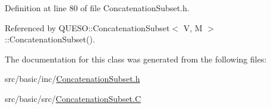 Definition at line 80 of file Concatenation\-Subset.\-h.



Referenced by Q\-U\-E\-S\-O\-::\-Concatenation\-Subset$<$ V, M $>$\-::\-Concatenation\-Subset().



The documentation for this class was generated from the following files\-:\begin{DoxyCompactItemize}
\item 
src/basic/inc/\hyperlink{_concatenation_subset_8h}{Concatenation\-Subset.\-h}\item 
src/basic/src/\hyperlink{_concatenation_subset_8_c}{Concatenation\-Subset.\-C}\end{DoxyCompactItemize}
